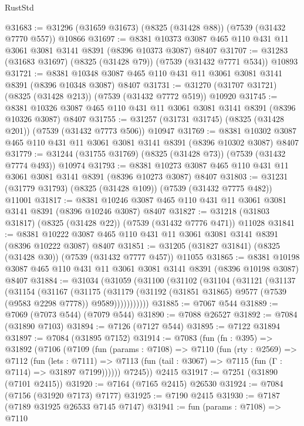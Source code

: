 \begin{lexlean}{RustStd}
\begin{coremodule}
@31683 := @31296 (@31659 @31673) (@8325 (@31428 @88)) (@7539 (@31432 @7770 @557)) @10866
@31697 := @8381 @10373 @3087 @465 @110 @431 @11 @3061 @3081 @3141 @8391 (@8396 @10373 @3087) @8407
@31707 := @31283 (@31683 @31697) (@8325 (@31428 @79)) (@7539 (@31432 @7771 @534)) @10893
@31721 := @8381 @10348 @3087 @465 @110 @431 @11 @3061 @3081 @3141 @8391 (@8396 @10348 @3087) @8407
@31731 := @31270 (@31707 @31721) (@8325 (@31428 @213)) (@7539 (@31432 @7772 @519)) @10920
@31745 := @8381 @10326 @3087 @465 @110 @431 @11 @3061 @3081 @3141 @8391 (@8396 @10326 @3087) @8407
@31755 := @31257 (@31731 @31745) (@8325 (@31428 @201)) (@7539 (@31432 @7773 @506)) @10947
@31769 := @8381 @10302 @3087 @465 @110 @431 @11 @3061 @3081 @3141 @8391 (@8396 @10302 @3087) @8407
@31779 := @31244 (@31755 @31769) (@8325 (@31428 @73)) (@7539 (@31432 @7774 @493)) @10974
@31793 := @8381 @10273 @3087 @465 @110 @431 @11 @3061 @3081 @3141 @8391 (@8396 @10273 @3087) @8407
@31803 := @31231 (@31779 @31793) (@8325 (@31428 @109)) (@7539 (@31432 @7775 @482)) @11001
@31817 := @8381 @10246 @3087 @465 @110 @431 @11 @3061 @3081 @3141 @8391 (@8396 @10246 @3087) @8407
@31827 := @31218 (@31803 @31817) (@8325 (@31428 @22)) (@7539 (@31432 @7776 @471)) @11028
@31841 := @8381 @10222 @3087 @465 @110 @431 @11 @3061 @3081 @3141 @8391 (@8396 @10222 @3087) @8407
@31851 := @31205 (@31827 @31841) (@8325 (@31428 @30)) (@7539 (@31432 @7777 @457)) @11055
@31865 := @8381 @10198 @3087 @465 @110 @431 @11 @3061 @3081 @3141 @8391 (@8396 @10198 @3087) @8407
@31884 := @31034
    (@31059
      (@31100
        (@31102
          (@31104
            (@31121
              (@31137
                (@31154
                  (@31167
                    (@31175
                      (@31179
                        (@31192 (@31851 @31865) @9577 (@7539 (@9583 @2298 @7778)) @9589)))))))))))
@31885 := @7067 @544
@31889 := @7069 (@7073 @544) (@7079 @544)
@31890 := @7088 @26527
@31892 := @7084 (@31890 @7103)
@31894 := @7126 (@7127 @544)
@31895 := @7122 @31894
@31897 := @7084 (@31895 @7152)
@31914 := @7083
    (fun (fn : @395) =>
    @31892
      (@7106
        (@7109
          (fun (params : @7108) =>
          @7110
            (fun (rty : @2569) =>
            @7112
              (fun (lets : @7111) =>
              @7113 (fun (tail : @3067) => @7115 (fun (Γ : @7114) => @31897 @7199))))))
        @7245))
    @2415
@31917 := @7251 (@31890 (@7101 @2415))
@31920 := @7164 (@7165 @2415) @26530
@31924 := @7084 (@7156 (@31920 @7173) @7177)
@31925 := @7190 @2415
@31930 := @7187 (@7189 @31925 @26533 @7145 @7147)
@31941 := fun (params : @7108) =>
  @7110

\end{coremodule}
\end{lexlean}
